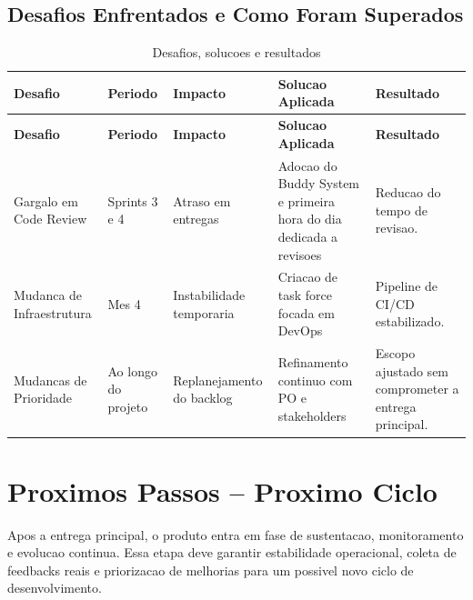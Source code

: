\documentclass[12pt,a4paper]{article}
\begin{document}
\subsection{Desafios Enfrentados e Como Foram Superados}

\begin{longtable}{@{}L{3.1cm}L{2.3cm}L{3.1cm}L{4.1cm}L{3.1cm}@{}}
  \caption{Desafios, solucoes e resultados}\\
  \toprule
  \textbf{Desafio} & \textbf{Periodo} & \textbf{Impacto} & \textbf{Solucao Aplicada} & \textbf{Resultado} \\
  \midrule
  \endfirsthead
  \toprule
  \textbf{Desafio} & \textbf{Periodo} & \textbf{Impacto} & \textbf{Solucao Aplicada} & \textbf{Resultado} \\
  \midrule
  \endhead
  Gargalo em Code Review & Sprints 3 e 4 & Atraso em entregas & Adocao do Buddy System e primeira hora do dia dedicada a revisoes & Reducao do tempo de revisao. \\
  Mudanca de Infraestrutura & Mes 4 & Instabilidade temporaria & Criacao de task force focada em DevOps & Pipeline de CI/CD estabilizado. \\
  Mudancas de Prioridade & Ao longo do projeto & Replanejamento do backlog & Refinamento continuo com PO e stakeholders & Escopo ajustado sem comprometer a entrega principal. \\
  \bottomrule
\end{longtable}

\section{Proximos Passos -- Proximo Ciclo}

Apos a entrega principal, o produto entra em fase de sustentacao, monitoramento e evolucao continua. Essa etapa deve garantir estabilidade operacional, coleta de feedbacks reais e priorizacao de melhorias para um possivel novo ciclo de desenvolvimento.
\end{document}
